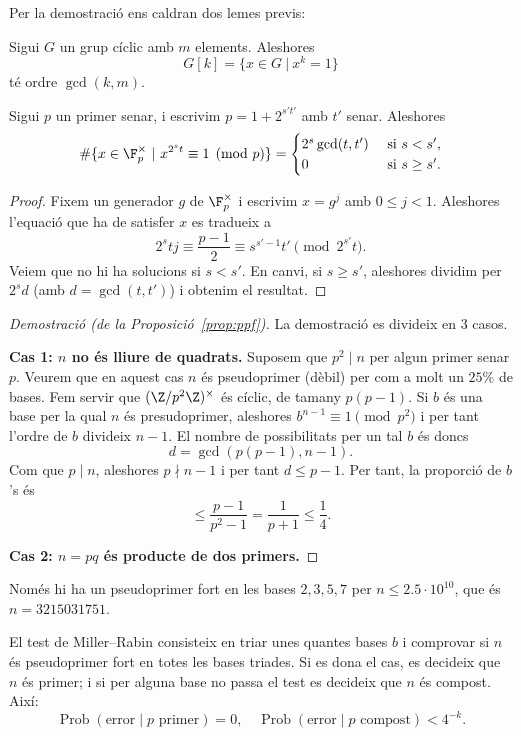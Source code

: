  Per la demostració ens caldran dos lemes previs:
 \begin{lemma}
 Sigui $G$ un grup cíclic amb $m$ elements. Aleshores
 \[
 G[k]=\{x\in G ~|~ x^k=1\}
 \]
 té ordre $\gcd(k,m)$.
 \end{lemma}
 \begin{lemma}
 Sigui $p$ un primer senar, i escrivim $p=1+2^{s't'}$ amb $t'$ senar. Aleshores
 \[
\#\{x\in \F_p^\times ~|~ x^{2^st}\equiv 1\pmod p\}
=
\begin{cases}
 2^s\gcd(t,t')&\text{ si } s<s',\\
 0&\text{ si } s\geq s'.
\end{cases}
 \]
 \end{lemma}
 \begin{proof}
 Fixem un generador $g$ de $\F_p^\times$ i escrivim $x=g^j$ amb $0\leq j < 1$. Aleshores l'equació que ha de satisfer $x$ es tradueix a
\[
2^stj\equiv \frac{p-1}{2}\equiv s^{s'-1}t'\pmod{2^{s'}t}.
\]
Veiem que no hi ha solucions si $s<s'$. En canvi, si $s\geq s'$, aleshores dividim per $2^sd$ (amb $d=\gcd(t,t')$) i obtenim el resultat.
 \end{proof}
 \begin{proof}[Demostració (de la Proposició~\ref{prop:ppf})]
 
 La demostració es divideix en $3$ casos.
 
 \textbf{Cas 1: $n$ no és lliure de quadrats.} 
 Suposem que $p^2\mid n$ per algun primer senar $p$. Veurem que en aquest cas $n$ és pseudoprimer (dèbil) per com a molt un $25\%$ de bases. Fem servir que $(\Z/p^2\Z)^\times$ és cíclic, de tamany $p(p-1)$. Si $b$ és una base per la qual $n$ és presudoprimer, aleshores $b^{n-1}\equiv 1\pmod{p^2}$ i per tant l'ordre de $b$ divideix $n-1$. El nombre de possibilitats per un tal $b$ és doncs
\[
d=\gcd(p(p-1),n-1).
\]
Com que $p\mid n$, aleshores $p\nmid n-1$ i per tant $d\leq p-1$. Per tant, la proporció de $b$'s és
\[
\leq \frac{p-1}{p^2-1}=\frac{1}{p+1}\leq \frac{1}{4}.
\]

 \textbf{Cas 2: $n=pq$ és producte de dos primers.}
 
 \end{proof}
 \begin{remark}
 Només hi ha un pseudoprimer fort en les bases $2, 3, 5, 7$ per $n\leq 2.5\cdot 10^{10}$, que és $n=3215031751$.
 \end{remark}
 
 El test de Miller--Rabin consisteix en triar unes quantes bases $b$ i comprovar si $n$ és pseudoprimer fort en totes les bases triades. Si es dona el cas, es decideix que $n$ és primer; i si per alguna base no passa el test es decideix que $n$ és compost. Així:
 \[
 \operatorname{Prob}(\text{error} \mid p\text{ primer}) = 0,\quad \operatorname{Prob}(\text{error} \mid p\text{ compost})<4^{-k}.
 \]
 

